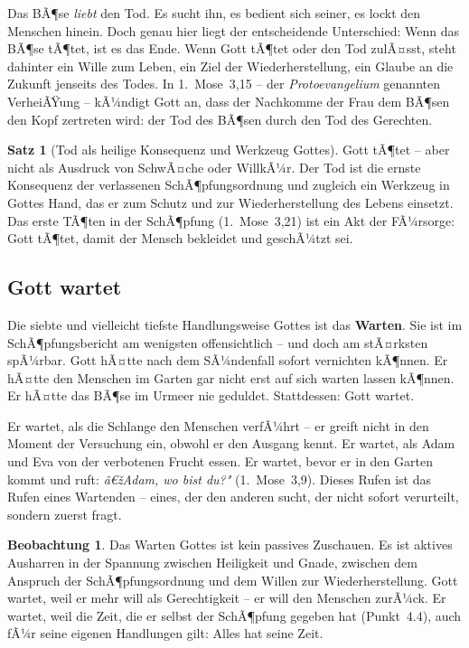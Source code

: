 ﻿\documentclass[a4paper,12pt]{article}
\theoremstyle{definition}
\newtheorem{theorem}{Satz}[section]
\newtheorem{observation}{Beobachtung}[section]
\begin{document}
Das BÃ¶se \textit{liebt} den Tod. Es sucht ihn, es bedient sich seiner, es lockt
den Menschen hinein. Doch genau hier liegt der entscheidende Unterschied: Wenn
das BÃ¶se tÃ¶tet, ist es das Ende. Wenn Gott tÃ¶tet oder den Tod zulÃ¤sst, steht
dahinter ein Wille zum Leben, ein Ziel der Wiederherstellung, ein Glaube an die
Zukunft jenseits des Todes. In 1.~Mose~3,15 -- der \textit{Protoevangelium}
genannten VerheiÃŸung -- kÃ¼ndigt Gott an, dass der Nachkomme der Frau dem BÃ¶sen
den Kopf zertreten wird: der Tod des BÃ¶sen durch den Tod des Gerechten.

\begin{theorem}[Tod als heilige Konsequenz und Werkzeug Gottes]
	Gott tÃ¶tet -- aber nicht als Ausdruck von SchwÃ¤che oder WillkÃ¼r. Der Tod ist
	die ernste Konsequenz der verlassenen SchÃ¶pfungsordnung und zugleich ein
	Werkzeug in Gottes Hand, das er zum Schutz und zur Wiederherstellung des Lebens
	einsetzt. Das erste TÃ¶ten in der SchÃ¶pfung (1.~Mose~3,21) ist ein Akt der
	FÃ¼rsorge: Gott tÃ¶tet, damit der Mensch bekleidet und geschÃ¼tzt sei.
\end{theorem}

\subsection{Gott wartet}

Die siebte und vielleicht tiefste Handlungsweise Gottes ist das \textbf{Warten}.
Sie ist im SchÃ¶pfungsbericht am wenigsten offensichtlich -- und doch am stÃ¤rksten
spÃ¼rbar. Gott hÃ¤tte nach dem SÃ¼ndenfall sofort vernichten kÃ¶nnen. Er hÃ¤tte den
Menschen im Garten gar nicht erst auf sich warten lassen kÃ¶nnen. Er hÃ¤tte das BÃ¶se
im Urmeer nie geduldet. Stattdessen: Gott wartet.

Er wartet, als die Schlange den Menschen verfÃ¼hrt -- er greift nicht in den Moment
der Versuchung ein, obwohl er den Ausgang kennt. Er wartet, als Adam und Eva
von der verbotenen Frucht essen. Er wartet, bevor er in den Garten kommt und ruft:
\textit{â€žAdam, wo bist du?"} (1.~Mose~3,9). Dieses Rufen ist das Rufen eines
Wartenden -- eines, der den anderen sucht, der nicht sofort verurteilt, sondern
zuerst fragt.

\begin{observation}
	Das Warten Gottes ist kein passives Zuschauen. Es ist aktives Ausharren in der
	Spannung zwischen Heiligkeit und Gnade, zwischen dem Anspruch der SchÃ¶pfungsordnung
	und dem Willen zur Wiederherstellung. Gott wartet, weil er mehr will als
	Gerechtigkeit -- er will den Menschen zurÃ¼ck. Er wartet, weil die Zeit, die er
	selbst der SchÃ¶pfung gegeben hat (Punkt~4.4), auch fÃ¼r seine eigenen Handlungen
	gilt: Alles hat seine Zeit.
\end{observation}
\end{document}
